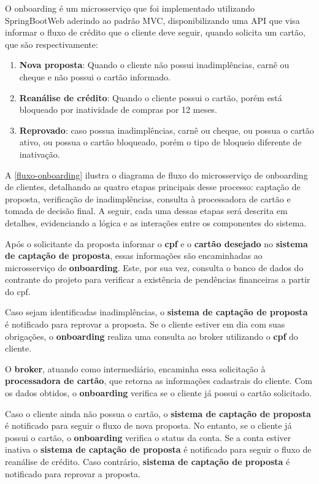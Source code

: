 O onboarding é um microsserviço que foi implementado utilizando SpringBootWeb aderindo ao padrão MVC, disponibilizando 
uma API que visa informar o fluxo de crédito que o cliente deve seguir, quando solicita um cartão, 
que são respectivamente: 
\begin{enumerate}
    \item \textbf{Nova proposta}: Quando o cliente não possui inadimplências, carnê ou cheque e não possui o cartão informado. 					
    \item \textbf{Reanálise de crédito}: Quando o cliente possui o cartão, porém está bloqueado por inatividade de compras por 12 meses.
    \item \textbf{Reprovado}: caso possua inadimplências, carnê ou cheque, ou possua o cartão ativo, ou possua o cartão bloqueado, porém o tipo de bloqueio diferente de inativação. 
\end{enumerate}

A \autoref{fluxo-onboarding} ilustra o diagrama de fluxo do microsserviço de onboarding de clientes, detalhando as 
quatro etapas principais desse processo: captação de proposta, verificação de 
inadimplências, consulta à processadora de cartão e tomada de decisão final. 
A seguir, cada uma dessas etapas será descrita em detalhes, evidenciando a lógica e as interações entre os componentes do sistema.

Após o solicitante da proposta informar o \textbf{cpf} e o \textbf{cartão desejado} no 
\textbf{sistema de captação de proposta}, essas informações são
encaminhadas ao microsserviço de \textbf{onboarding}. Este, por sua vez, 
consulta o banco de dados do contrante do projeto para verificar a existência de 
pendências financeiras a partir do cpf. 

Caso sejam identificadas inadimplências, o \textbf{sistema de captação de proposta} é notificado para reprovar a proposta.
Se o cliente estiver em dia com suas obrigações, o \textbf{onboarding} realiza uma consulta ao broker utilizando o \textbf{cpf} do cliente. 

O \textbf{broker}, atuando como intermediário, encaminha essa solicitação à \textbf{processadora de cartão},
que retorna as informações cadastrais do cliente. Com os dados obtidos, o \textbf{onboarding} verifica se o cliente já possui o cartão solicitado.

Caso o cliente ainda não possua o cartão, o \textbf{sistema de captação de proposta} é notificado para seguir o 
fluxo de nova proposta. No entanto, se o cliente já possui o cartão, 
o \textbf{onboarding} verifica o status da conta. Se a conta estiver inativa o 
\textbf{sistema de captação de proposta} é notificado para seguir o fluxo de reanálise de crédito. 
Caso contrário, \textbf{sistema de captação de proposta} é notificado para reprovar a proposta.

